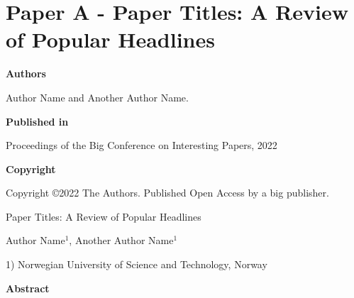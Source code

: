 \chapter{Paper A - Paper Titles: A Review of Popular Headlines}

\noindent \textbf{Authors}

\vspace*{0.3cm}

\noindent Author Name and Another Author Name.

\vspace*{0.7cm}

\noindent \textbf{Published in}

\vspace*{0.3cm}

\noindent Proceedings of the Big Conference on Interesting Papers, 2022

\vspace*{0.7cm}

\noindent \textbf{Copyright}

\vspace*{0.3cm}

\noindent Copyright ©2022 The Authors. Published Open Access by a big publisher.
\paperthumb
\newpage


\vspace*{0.1cm}

\begin{center}

\Huge{Paper Titles: A Review of Popular Headlines}

\vspace{0.6cm}

\large{Author Name$^{1}$, Another Author Name$^{1}$}

\vspace{0.1cm}

\small{1) Norwegian University of Science and Technology, Norway}
\end{center}

\vspace{0.2cm}

\begin{center}
  \textbf{Abstract}
\end{center}
\begin{changemargin}{0.75cm}{0.75cm} 
\lipsum[2]
\end{changemargin}

\vspace{1cm}

